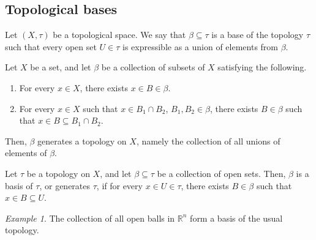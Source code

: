 \documentclass[11pt]{article}
\newcommand{\R}{\mathbb{R}}
\theoremstyle{definition}
\theoremstyle{remark}
\newtheorem*{example}{Example}
\numberwithin{equation}{section}
\begin{document}
    \subsection{Topological bases}

    \begin{definition}
        Let $(X, \tau)$ be a topological space. We say that $\beta \subseteq
        \tau$ is a base of the topology $\tau$ such that every open set $U \in \tau$
        is expressible as a union of elements from $\beta$. 
    \end{definition}

    \begin{definition}
        Let $X$ be a set, and let $\beta$ be a collection of subsets of $X$
        satisfying the following.
        \begin{enumerate}
            \itemsep0em
            \item For every $x \in X$, there exists $x \in B \in \beta$.
            \item For every $x \in X$ such that $x \in B_1 \cap B_2$, $B_1, B_2 \in
            \beta$, there exists $B \in \beta$ such that $x \in B \subseteq B_1 \cap
            B_2$.
        \end{enumerate}
        Then, $\beta$ generates a topology on $X$, namely the collection of all
        unions of elements of $\beta$.
    \end{definition}

    \begin{lemma}
        Let $\tau$ be a topology on $X$, and let $\beta \subseteq \tau$ be a
        collection of open sets. Then, $\beta$ is a basis of $\tau$, or generates
        $\tau$, if for every $x \in U \in \tau$, there exists $B \in \beta$ such that
        $x \in B \subseteq U$.
    \end{lemma}
    \begin{example}
        The collection of all open balls in $\R^n$ form a basis of the usual topology.
    \end{example}
\end{document}
